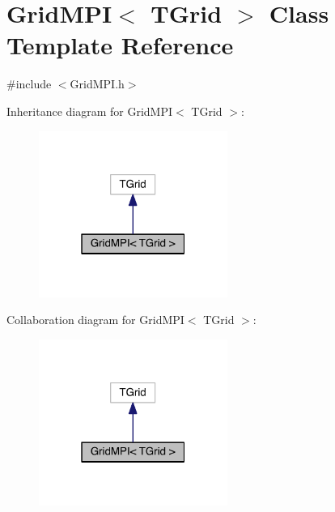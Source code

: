 \hypertarget{class_grid_m_p_i}{}\section{Grid\+M\+P\+I$<$ T\+Grid $>$ Class Template Reference}
\label{class_grid_m_p_i}


{\ttfamily \#include $<$Grid\+M\+P\+I.\+h$>$}



Inheritance diagram for Grid\+M\+P\+I$<$ T\+Grid $>$\+:\nopagebreak
\begin{figure}[H]
\begin{center}
\leavevmode
\includegraphics[width=175pt]{de/dce/class_grid_m_p_i__inherit__graph}
\end{center}
\end{figure}


Collaboration diagram for Grid\+M\+P\+I$<$ T\+Grid $>$\+:\nopagebreak
\begin{figure}[H]
\begin{center}
\leavevmode
\includegraphics[width=175pt]{dc/ddd/class_grid_m_p_i__coll__graph}
\end{center}
\end{figure}
